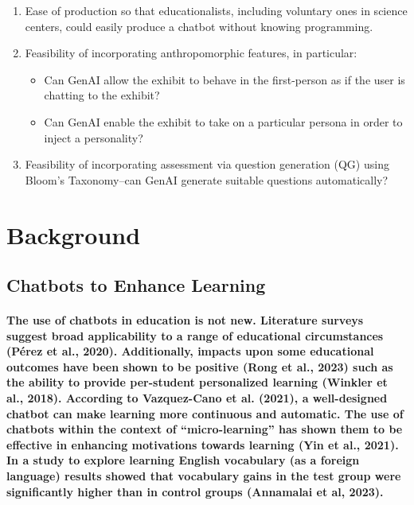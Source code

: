 \documentclass{article}
\begin{document}
\begin{enumerate}
    \item Ease of production so that educationalists, including voluntary ones in science centers, could easily produce a chatbot without knowing programming.
    \item Feasibility of incorporating anthropomorphic features, in particular:
    \begin{itemize}
        \item Can GenAI allow the exhibit to behave in the first-person as if the user is chatting to the exhibit?
        \item Can GenAI enable the exhibit to take on a particular persona in order to inject a personality?
    \end{itemize}
    \item Feasibility of incorporating assessment via question generation (QG) using Bloom’s Taxonomy–can GenAI generate suitable questions automatically?
\end{enumerate}

\newpage

\section*{Background}

\subsection*{Chatbots to Enhance Learning}

\paragraph{The use of chatbots in education is not new. Literature surveys suggest broad applicability to a range of educational circumstances (Pérez et al., 2020). Additionally, impacts upon some educational outcomes have been shown to be positive (Rong et al., 2023) such as the ability to provide per-student personalized learning (Winkler et al., 2018). According to Vazquez-Cano et al. (2021), a well-designed chatbot can make learning more continuous and automatic. The use of chatbots within the context of “micro-learning” has shown them to be effective in enhancing motivations towards learning (Yin et al., 2021). In a study to explore learning English vocabulary (as a foreign language) results showed that vocabulary gains in the test group were significantly higher than in control groups (Annamalai et al, 2023).}
\end{document}
